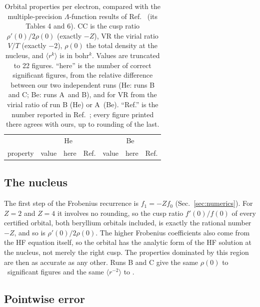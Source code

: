 \documentclass[aps,pra,reprint,superscriptaddress,amsmath,amssymb,longbibliography]{revtex4-2}
\begin{document}
\begin{table}[t]
\caption{Orbital properties per electron, compared with the multiple-precision $\Lambda$-function results of Ref.~\cite{Hatano2025} (its Tables 4 and 6). CC is the cusp ratio $\rho'(0)/2\rho(0)$ (exactly $-Z$), VR the virial ratio $V/T$ (exactly $-2$), $\rho(0)$ the total density at the nucleus, and $\langle r^k\rangle$ is in bohr$^k$. Values are truncated to 22 figures. ``here'' is the number of correct significant figures, from the relative difference between our two independent runs (He: runs B and C; Be: runs A\BeRef\ and B\BeRef), and for VR from the virial ratio of run B (He) or A\BeRef\ (Be). ``Ref.'' is the number reported in Ref.~\cite{Hatano2025}; every figure printed there agrees with ours, up to rounding of the last.}
\label{tab:props}
\footnotesize
\begin{ruledtabular}
\begin{tabular}{llrrlrr}
& \multicolumn{3}{c}{He} & \multicolumn{3}{c}{Be} \\
property & value & here & Ref. & value & here & Ref. \\
\hline

\end{tabular}
\end{ruledtabular}
\end{table}

\subsection{The nucleus}

The first step of the Frobenius recurrence is $f_1=-Zf_0$ (Sec.~\ref{sec:numerics}). For $Z=2$ and $Z=4$ it involves no rounding, so the cusp ratio $f'(0)/f(0)$ of every certified orbital, both beryllium orbitals included, is exactly the rational number $-Z$, and so is $\rho'(0)/2\rho(0)$. The higher Frobenius coefficients also come from the HF equation itself, so the orbital has the analytic form of the HF solution at the nucleus, not merely the right cusp. The properties dominated by this region are then as accurate as any other. Runs B and C give the same $\rho(0)$ to \PropRho\ significant figures and the same $\langle r^{-2}\rangle$ to \PropRtwo.

\subsection{Pointwise error}
\end{document}
